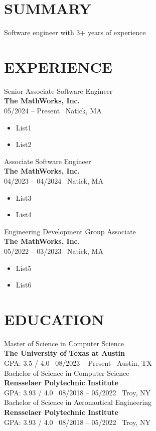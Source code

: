 \documentclass[11pt]{article}
\begin{document}
\begin{minipage}[t]{0.65\textwidth}
    \section*{SUMMARY}
    Software engineer with 3+ years of experience \\

    \section*{EXPERIENCE}
    {\Large Senior Associate Software Engineer} \\
    \textbf{The MathWorks, Inc.} \\
    05/2024 -- Present \textbar\ Natick, MA
    \begin{itemize}[leftmargin=*]
        \item List1
        \item List2\\
    \end{itemize}

    {\Large Associate Software Engineer} \\
    \textbf{The MathWorks, Inc.} \\
    04/2023 -- 04/2024 \textbar\ Natick, MA
    \begin{itemize}[leftmargin=*]
        \item List3
        \item List4\\
    \end{itemize}

    {\Large Engineering Development Group Associate} \\
    \textbf{The MathWorks, Inc.} \\
    05/2022 -- 03/2023 \textbar\ Natick, MA
    \begin{itemize}[leftmargin=*]
        \item List5
        \item List6
    \end{itemize}
    
    \section*{EDUCATION}
    {\Large Master of Science in Computer Science} \\
    \textbf{The University of Texas at Austin} \\
    GPA: 3.5 / 4.0 \textbar\ 08/2023 -- Present \textbar\ Austin, TX\\

    {\Large Bachelor of Science in Computer Science} \\
    \textbf{Rensselaer Polytechnic Institute} \\
    GPA: 3.93 / 4.0 \textbar\ 08/2018 -- 05/2022 \textbar\ Troy, NY\\

    {\Large Bachelor of Science in Aeronautical Engineering} \\
    \textbf{Rensselaer Polytechnic Institute} \\
    GPA: 3.93 / 4.0 \textbar\ 08/2018 -- 05/2022 \textbar\ Troy, NY
\end{minipage}
\end{document}
